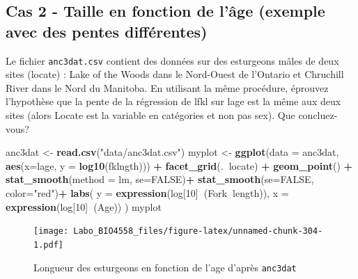 \documentclass[12pt,]{book}
\makeatletter
\newenvironment{Shaded}{\begin{snugshade}}{\end{snugshade}}
\newcommand{\DataTypeTok}[1]{\textcolor[rgb]{0.13,0.29,0.53}{#1}}
\newcommand{\DecValTok}[1]{\textcolor[rgb]{0.00,0.00,0.81}{#1}}
\newcommand{\KeywordTok}[1]{\textcolor[rgb]{0.13,0.29,0.53}{\textbf{#1}}}
\newcommand{\NormalTok}[1]{#1}
\newcommand{\OperatorTok}[1]{\textcolor[rgb]{0.81,0.36,0.00}{\textbf{#1}}}
\newcommand{\OtherTok}[1]{\textcolor[rgb]{0.56,0.35,0.01}{#1}}
\newcommand{\StringTok}[1]{\textcolor[rgb]{0.31,0.60,0.02}{#1}}
\newenvironment{kframe}{%
\medskip{}
\setlength{\fboxsep}{.8em}
\def\at@end@of@kframe{}%
\ifinner\ifhmode%
 \def\at@end@of@kframe{\end{minipage}}%
 \begin{minipage}{\columnwidth}%
\fi\fi%
\def\FrameCommand##1{\hskip\@totalleftmargin \hskip-\fboxsep
\colorbox{incolor}{##1}\hskip-\fboxsep
    \hskip-\linewidth \hskip-\@totalleftmargin \hskip\columnwidth}%
\MakeFramed {\advance\hsize-\width
  \@totalleftmargin\z@ \linewidth\hsize
  \@setminipage}}%
{\par\unskip\endMakeFramed%
\at@end@of@kframe}
\newenvironment{rmdblock}[1]
 {
 \begin{itemize}
 \renewcommand{\labelitemi}{
   \raisebox{-.7\height}[0pt][0pt]{
     {\setkeys{Gin}{width=3em,keepaspectratio}\texttt{[image: images/\#1]}}
   }
 }
 \begin{kframe}
 \setlength{\fboxsep}{1em}
 \item
 }
 {
 \end{kframe}
 \end{itemize}
 }
\newenvironment{rmdcode}
  {\begin{rmdblock}{screen}}
  {\end{rmdblock}}
\makeatother
\begin{document}
\hypertarget{cas-2---taille-en-fonction-de-luxe2ge-exemple-avec-des-pentes-diffuxe9rentes}{%
\subsection{Cas 2 - Taille en fonction de l'âge (exemple avec des pentes différentes)}\label{cas-2---taille-en-fonction-de-luxe2ge-exemple-avec-des-pentes-diffuxe9rentes}}

\begin{rmdcode}
Le fichier \texttt{anc3dat.csv} contient des données sur des esturgeons mâles de deux sites (locate) : Lake of the Woods dans le Nord-Ouest de l'Ontario et Chruchill River dans le Nord du Manitoba. En utilisant la même procédure, éprouvez l'hypothèse que la pente de la régression de lfkl sur lage est la même aux deux sites (alors Locate est la variable en catégories et non pas sex). Que concluez-vous?
\end{rmdcode}

\begin{Shaded}
\begin{Highlighting}[]
\NormalTok{anc3dat <-}\StringTok{ }\KeywordTok{read.csv}\NormalTok{(}\StringTok{"data/anc3dat.csv"}\NormalTok{)}
\NormalTok{myplot <-}\StringTok{ }\KeywordTok{ggplot}\NormalTok{(}\DataTypeTok{data =}\NormalTok{ anc3dat, }\KeywordTok{aes}\NormalTok{(}\DataTypeTok{x=}\NormalTok{lage, }\DataTypeTok{y =} \KeywordTok{log10}\NormalTok{(fklngth))) }\OperatorTok{+}
\StringTok{  }\KeywordTok{facet_grid}\NormalTok{(.}\OperatorTok{~}\NormalTok{locate) }\OperatorTok{+}
\StringTok{  }\KeywordTok{geom_point}\NormalTok{() }\OperatorTok{+}
\StringTok{  }\KeywordTok{stat_smooth}\NormalTok{(}\DataTypeTok{method =}\NormalTok{ lm, }\DataTypeTok{se=}\OtherTok{FALSE}\NormalTok{)}\OperatorTok{+}
\StringTok{  }\KeywordTok{stat_smooth}\NormalTok{(}\DataTypeTok{se=}\OtherTok{FALSE}\NormalTok{, }\DataTypeTok{color=}\StringTok{"red"}\NormalTok{)}\OperatorTok{+}
\StringTok{  }\KeywordTok{labs}\NormalTok{(}
    \DataTypeTok{y =} \KeywordTok{expression}\NormalTok{(log[}\DecValTok{10}\NormalTok{]}\OperatorTok{~}\NormalTok{(Fork}\OperatorTok{~}\NormalTok{length)),}
    \DataTypeTok{x =} \KeywordTok{expression}\NormalTok{(log[}\DecValTok{10}\NormalTok{]}\OperatorTok{~}\NormalTok{(Age))}
\NormalTok{)}
\NormalTok{myplot}
\end{Highlighting}
\end{Shaded}

\begin{figure}
\centering
\texttt{[image: Labo\_BIO4558\_files/figure-latex/unnamed-chunk-304-1.pdf]}
\caption{\label{fig:unnamed-chunk-304}Longueur des esturgeons en fonction de l'age d'après \texttt{anc3dat}}
\end{figure}
\end{document}

